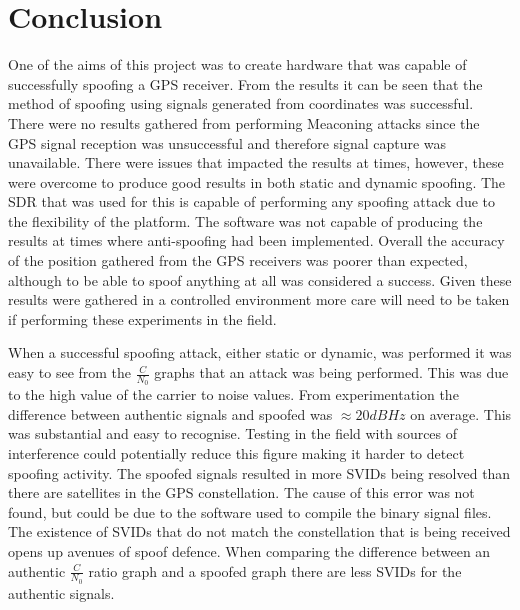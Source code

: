 
\chapter{Conclusion} %

\label{Chapter6} %


One of the aims of this project was to create hardware that was capable of successfully spoofing a GPS receiver. From the results it can be seen that the method of
spoofing using signals generated from coordinates was successful. There were no results gathered from performing Meaconing attacks since the GPS signal reception was
unsuccessful and therefore signal capture was unavailable. There were issues that impacted the results at times, however, these were overcome to produce good results in
both static and dynamic spoofing. The SDR that was used for this is capable of performing any spoofing attack due to the flexibility of the platform. The software was not
capable of producing the results at times where anti-spoofing had been implemented. Overall the accuracy of the position gathered from the GPS receivers was poorer than expected,
although to be able to spoof anything at all was considered a success. Given these results were gathered in a controlled environment more care will need to be taken if
performing these experiments in the field. 

\bigskip

When a successful spoofing attack, either static or dynamic, was performed it was easy to see from the $\frac{C}{N_0}$ graphs that an attack was being performed. This
was due to the high value of the carrier to noise values. From experimentation the difference between authentic signals and spoofed was $\approx 20dBHz$ on average. This was
substantial and easy to recognise. Testing in the field with sources of interference could potentially reduce this figure making it harder to detect spoofing activity.
The spoofed signals resulted in more SVIDs being resolved than there are satellites in the GPS constellation. The cause of this error was not found, but could be due to the software
used to compile the binary signal files. The existence of SVIDs that do not match the constellation that is being received opens up avenues of spoof defence. 
When comparing the difference between an authentic $\frac{C}{N_0}$
ratio graph and a spoofed graph there are less SVIDs for the authentic signals.  

